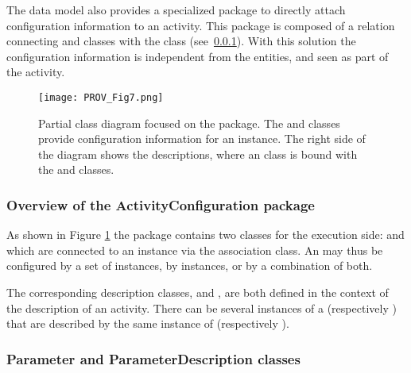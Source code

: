 The data model also provides a specialized  package to directly attach configuration information to an activity. This package is composed of a  relation connecting   and  classes with the  class (see~\ref{sec:configurationpackage}). With this solution the configuration information is independent from the entities, and seen as part of the activity.


\begin{figure}[hbt]
\centering
\texttt{[image: PROV\_Fig7.png]}
\caption[Partial class diagram focused on the  package.]{Partial class diagram focused on the  package. The  and  classes provide configuration information for an  instance. The right side of the diagram shows the descriptions, where an  class is bound with the  and  classes.}
\label{fig:activityconfig}
\end{figure}


\subsubsection{Overview of the ActivityConfiguration package} \label{sec:configurationpackage}

As shown in Figure \ref{fig:activityconfig} the  package contains two classes for the execution side:  and  which are connected to an  instance via the  association class.
An  may thus be configured by a set of  instances, by  instances, or by a combination of both.

The corresponding description classes,  and , are both defined in the context of the description of an activity.
There can be several instances of a  (respectively ) that are described by the same instance of  (respectively ).


\subsubsection{Parameter and ParameterDescription classes}
\label{sec:parameterandD}

